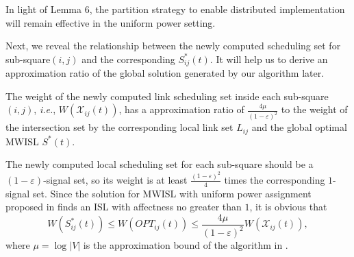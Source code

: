\documentclass[journal]{IEEEtran}
\begin{document}
In light of Lemma $6$, the partition strategy to enable distributed implementation will remain effective  in the uniform power setting.

Next, we reveal the relationship between the newly computed scheduling set  for sub-square$(i,j)$ and the corresponding $S^*_{ij}(t)$. It will help us to derive an approximation ratio of the global solution generated by our algorithm later.
\begin{lemma}
The weight of the newly computed link scheduling  set inside each sub-square$(i,j)$,
\emph{i.e.}, $W(\mathcal{X}_{ij} (t))$,  has a  approximation ratio of $\frac{4 \mu}{(1-\varepsilon)^2}$ to
the weight of the intersection set by the corresponding local link set $L_{ij} $ and the global optimal MWISL $S^\ast (t)$.
\label{lemma6}
\end{lemma}
\begin{IEEEproof}
 The newly computed local scheduling set for each sub-square should be a $(1-\varepsilon)$-signal set, so its weight is at least $\frac{(1-\varepsilon)^2}{4}$ times the corresponding $1$-signal set. Since the solution for MWISL with uniform power assignment proposed in \cite{S:phy9} finds an ISL with affectness no greater than $1$, it is obvious that
\begin{equation}
W(S^*_{ij}(t)) \le W(OPT_{ij}(t)) \le \frac{4\mu}{(1-\varepsilon)^2}W( \mathcal{X}_{ij} (t) ),
\end{equation}
where $\mu = \log |V|  $ is the approximation bound of the algorithm in \cite{S:phy9}.
\end{IEEEproof}
\end{document}
